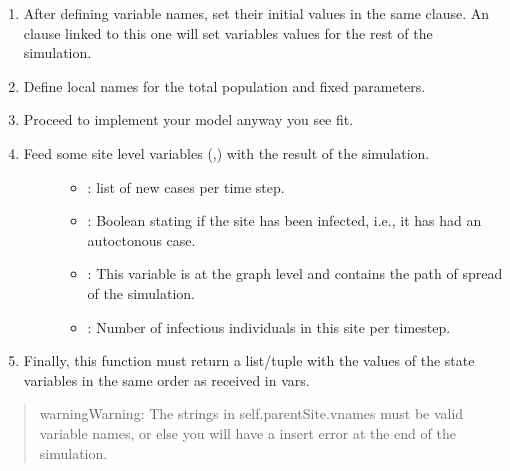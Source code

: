 \documentclass[letterpaper,10pt,english]{sphinxmanual}
\begin{document}
\begin{enumerate}
\begin{description}
\begin{enumerate}
\item {} 
After defining variable names, set their initial values in the same  clause. An  clause linked to this one will set variables values for the rest of the simulation.

\item {} 
Define local names for the total population  and fixed parameters.

\item {} 
Proceed to implement your model anyway you see fit.

\item {} \begin{description}
\item[{Feed some site level variables (,) with the result of the simulation.}] \leavevmode\begin{itemize}
\item {} 
: list of new cases per time step.

\item {} 
: Boolean stating if the site has been infected, i.e., it has had an autoctonous case.

\item {} 
: This variable is at the graph level and contains the path of spread of the simulation.

\item {} 
: Number of infectious individuals in this site per time\sphinxhyphen{}step.

\end{itemize}

\end{description}

\item {} 
Finally, this function must return a list/tuple with the values of the state variables in the same order as received in vars.

\end{enumerate}

\end{description}

\end{enumerate}
\begin{quote}

\begin{sphinxadmonition}{warning}{Warning:}
The strings in self.parentSite.vnames must be valid  variable names, or else you will have a insert error at the end of the simulation.
\end{sphinxadmonition}
\end{quote}
\end{document}
